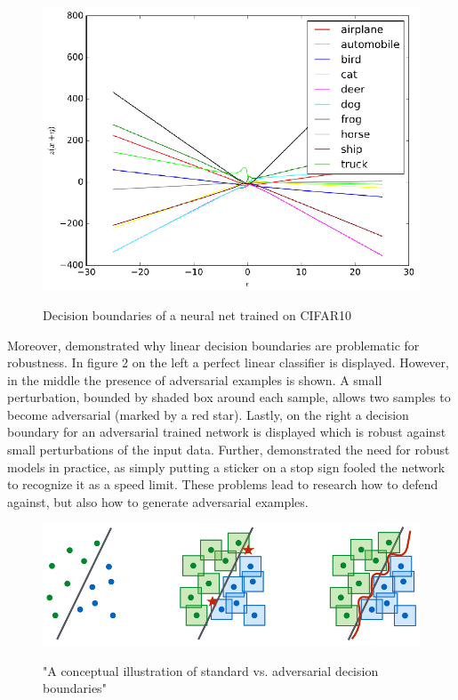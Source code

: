 \documentclass[conference]{IEEEtran}
\begin{document}
\begin{figure}[ht]
  \centering
  \vspace{-0.7cm}
  \includegraphics[scale=0.35]{CIFAR10-decision_boundary.png}
  \vspace{-0.35cm}
  \label{fig: Decision boundary of a neural network}
  \caption{Decision boundaries of a neural net trained on CIFAR10 \cite{b27}}
  \vspace{-0.2cm}
\end{figure}

Moreover, \cite{b2} demonstrated why linear decision boundaries are problematic for robustness. In figure 2 on the left a perfect linear classifier is displayed. However, in the middle the presence of adversarial examples is shown. A small perturbation, bounded by shaded box around each sample, allows two samples to become adversarial (marked by a red star). Lastly, on the right a decision boundary for an adversarial trained network is displayed which is robust against small perturbations of the input data. Further, \cite{b6} demonstrated the need for robust models in practice, as simply putting a sticker on a stop sign fooled the network to recognize it as a speed limit. These problems lead to research how to defend against, but also how to generate adversarial examples. \\

\begin{figure}[ht]
  \centering
  \vspace{-0.6cm}
  \includegraphics[scale=0.29]{decision_boundaries.png}
  \vspace{-0.45cm}
  \label{fig: standard and adversarial decision boundaries}
  \caption{"A conceptual illustration of standard vs. adversarial decision boundaries" \cite{b2}} 
  \vspace{-0.2cm}
\end{figure}
\end{document}
